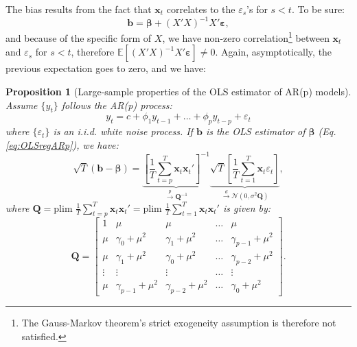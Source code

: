 \documentclass[
  11pt,
]{book}
\newtheorem{proposition}{Proposition}[chapter]
\theoremstyle{definition}
\theoremstyle{definition}
\theoremstyle{definition}
\theoremstyle{definition}
\theoremstyle{remark}
\begin{document}
The bias results from the fact that \(\mathbf{x}_t\) correlates to the \(\varepsilon_s\)'s for \(s<t\). To be sure:
\begin{equation}
\mathbf{b} = \boldsymbol{\beta} + (X'X)^{-1}X'\boldsymbol\varepsilon,\label{eq:olsar1}
\end{equation}
and because of the specific form of \(X\), we have non-zero correlation\footnote{The Gauss-Markov theorem's strict exogeneity assumption is therefore not satisfied.} between \(\mathbf{x}_t\) and \(\varepsilon_s\) for \(s<t\), therefore \(\mathbb{E}[(X'X)^{-1}X'\boldsymbol\varepsilon] \ne 0\). Again, asymptotically, the previous expectation goes to zero, and we have:

\begin{proposition}[Large-sample properties of the OLS estimator of AR(p) models]
\protect\hypertarget{prp:cgceOLSARp}{}\label{prp:cgceOLSARp}Assume \(\{y_t\}\) follows the AR(p) process:
\[
y_t = c + \phi_1 y_{t-1} + \dots + \phi_p y_{t-p} + \varepsilon_t
\]
where \(\{\varepsilon_{t}\}\) is an i.i.d. white noise process. If \(\mathbf{b}\) is the OLS estimator of \(\boldsymbol\beta\) (Eq. \eqref{eq:OLSregARp}), we have:
\[
\sqrt{T}(\mathbf{b}-\boldsymbol{\beta}) =  \underbrace{\left[\frac{1}{T}\sum_{t=p}^T \mathbf{x}_t\mathbf{x}_t' \right]^{-1}}_{\overset{p}{\rightarrow} \mathbf{Q}^{-1}}
\underbrace{\sqrt{T} \left[\frac{1}{T}\sum_{t=1}^T \mathbf{x}_t\varepsilon_t \right]}_{\overset{d}{\rightarrow} \mathcal{N}(0,\sigma^2\mathbf{Q})},
\]
where \(\mathbf{Q} = \mbox{plim }\frac{1}{T}\sum_{t=p}^T \mathbf{x}_t\mathbf{x}_t'= \mbox{plim }\frac{1}{T}\sum_{t=1}^T \mathbf{x}_t\mathbf{x}_t'\) is given by:
\begin{equation}
\mathbf{Q} = \left[
\begin{array}{ccccc}
1 & \mu &\mu & \dots & \mu \\
\mu & \gamma_0 + \mu^2 & \gamma_1 + \mu^2 & \dots & \gamma_{p-1} + \mu^2\\
\mu & \gamma_1 + \mu^2 & \gamma_0 + \mu^2 & \dots & \gamma_{p-2} + \mu^2\\
\vdots &\vdots &\vdots &\dots &\vdots \\
\mu & \gamma_{p-1} + \mu^2 & \gamma_{p-2} + \mu^2 & \dots & \gamma_{0} + \mu^2
\end{array}
\right].\label{eq:Qols}
\end{equation}
\end{proposition}
\end{document}
